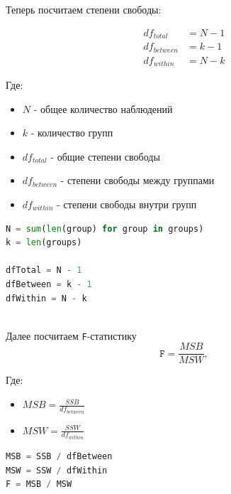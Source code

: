 \documentclass[14pt]{extreport}
\begin{document}
	
	
	Теперь посчитаем степени свободы:
	
	\begin{align*}
		df_{total} &= N - 1 \\
		df_{between} &= k - 1 \\
		df_{within} &= N - k
	\end{align*}
	
	Где:
	\begin{itemize}
		\item $N$ - общее количество наблюдений
		\item $k$ - количество групп
		\item $df_{total}$ - общие степени свободы
		\item $df_{between}$ - степени свободы между группами
		\item $df_{within}$ - степени свободы внутри групп
	\end{itemize}
	
\begin{lstlisting}[language=python, caption=Степени свободы]
N = sum(len(group) for group in groups)  
k = len(groups)                           

dfTotal = N - 1
dfBetween = k - 1
dfWithin = N - k
\end{lstlisting}

\noindent
{}
\\


Далее посчитаем \texttt{F}-статистику
\[
\texttt{F} = \frac{MSB}{MSW},
\]

Где: 
\begin{itemize}
	\item $MSB = \frac{SSB}{df_{between}}$ 
	\item $MSW = \frac{SSW}{df_{within}}$ 
\end{itemize}


	\begin{lstlisting}[language=python, caption=\texttt{F}-статистика]
MSB = SSB / dfBetween 
MSW = SSW / dfWithin
F = MSB / MSW 
\end{lstlisting}
\end{document}
